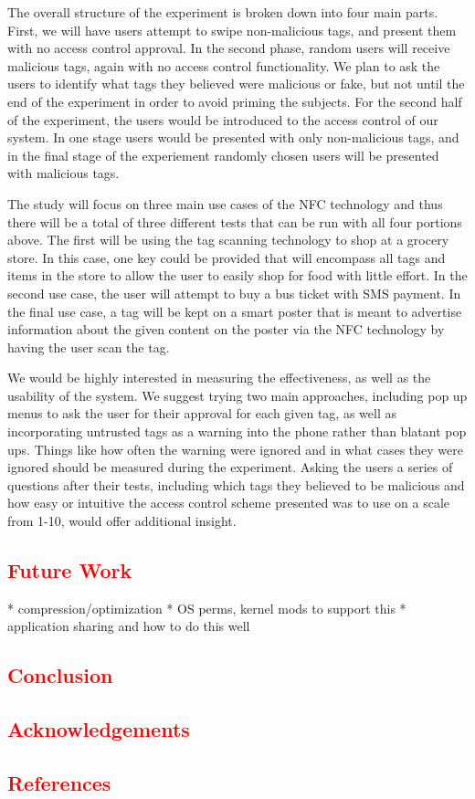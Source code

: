 \documentclass[12pt]{article}
\newcommand\TODO[1]{\textcolor{red}{#1}}
\begin{document}
The overall structure of the experiment is broken down into four main parts. First, we will have users attempt to swipe non-malicious tags, and present them with no access control approval. In the second phase, random users will receive malicious tags, again with no access control functionality. We plan to ask the users to identify what tags they believed were malicious or fake, but not until the end of the experiment in order to avoid priming the subjects. For the second half of the experiment, the users would be introduced to the access control of our system. In one stage users would be presented with only non-malicious tags, and in the final stage of the experiement randomly chosen users will be presented with malicious tags. 

The study will focus on three main use cases of the NFC technology and thus there will be a total of three different tests that can be run with all four portions above. The first will be using the tag scanning technology to shop at a grocery store. In this case, one key could be provided that will encompass all tags and items in the store to allow the user to easily shop for food with little effort. In the second use case, the user will attempt to buy a bus ticket with SMS payment. In the final use case, a tag will be kept on a smart poster that is meant to advertise information about the given content on the poster via the NFC technology by having the user scan the tag. 

We would be highly interested in measuring the effectiveness, as well as the usability of the system. We suggest trying two main approaches, including pop up menus to ask the user for their approval for each given tag, as well as incorporating untrusted tags as a warning into the phone rather than blatant pop ups. Things like how often the warning were ignored and in what cases they were ignored should be measured during the experiment. Asking the users a series of questions after their tests, including which tags they believed to be malicious and how easy or intuitive the access control scheme presented was to use on a scale from 1-10, would offer additional insight. 

\TODO{\section{Future Work}}
* compression/optimization
* OS perms, kernel mods to support this
* application sharing and how to do this well

\TODO{\section{Conclusion}}

\TODO{\section{Acknowledgements}}

\TODO{\section{References}}



\end{document}
